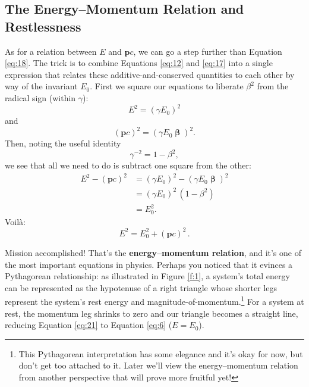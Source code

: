 \documentclass[12pt]{article}
\renewcommand{\vv}[1]{\mathbf{#1}}
\newcommand{\vvbeta}{\bm{\upbeta}}
\begin{document}
\subsection{The Energy--Momentum Relation and Restlessness}\label{ssec:em}

As for a relation between $E$ and $\vv p c$, we can go a step further than Equation \ref{eq:18}. The trick is to combine Equations \ref{eq:12} and \ref{eq:17} into a single expression that relates these additive-and-conserved quantities to each other by way of the invariant $E_0$. First we square our equations to liberate $\beta^2$ from the radical sign (within $\gamma$):
\begin{equation*}
E^2 = (\gamma E_0)^2
\end{equation*}
and
\begin{equation*}
(\vv p c)^2 = (\gamma E_0 \vvbeta)^2.
\end{equation*}
Then, noting the useful identity
\begin{equation}\label{eq:20}
\gamma^{-2} = 1 - \beta^2,
\end{equation}
we see that all we need to do is subtract one square from the other:
\begin{equation*}
\begin{split}
E^2 - (\vv p c)^2 &= (\gamma E_0)^2 - (\gamma E_0 \vvbeta)^2 \\[2pt]
&= (\gamma E_0)^2 \, (1 - \beta^2) \\[2pt]
&= E_0^2.
\end{split}
\end{equation*}
Voil\`a:
\begin{equation}\label{eq:21}
\boxed{E^2=E_0^2+(\vv p c)^2} \, .
\end{equation}

Mission accomplished! That's the \textbf{energy--momentum relation}, and it's one of the most important equations in physics. Perhaps you noticed that it evinces a Pythagorean relationship: as illustrated in Figure \ref{f:1}, a system's total energy can be represented as the hypotenuse of a right triangle whose shorter legs represent the system's rest energy and magnitude-of-momentum.\footnote{This Pythagorean interpretation has some elegance and it's okay for now, but don't get too attached to it. Later we'll view the energy--momentum relation from another perspective that will prove more fruitful yet!} For a system at rest, the momentum leg shrinks to zero and our triangle becomes a straight line, reducing Equation \ref{eq:21} to Equation \ref{eq:6} ($E=E_0$).
\end{document}
